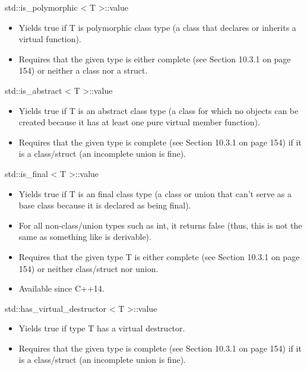 std::is\_polymorphic < T >::value

\begin{itemize}
\item 
Yields true if T is polymorphic class type (a class that declares or inherits a virtual function).

\item 
Requires that the given type is either complete (see Section 10.3.1 on page 154) or neither a class nor a struct.
\end{itemize}


std::is\_abstract < T >::value

\begin{itemize}
\item 
Yields true if T is an abstract class type (a class for which no objects can be created because it has at least one pure virtual member function).

\item 
Requires that the given type is complete (see Section 10.3.1 on page 154) if it is a class/struct (an incomplete union is fine).
\end{itemize}

std::is\_final < T >::value

\begin{itemize}
\item 
Yields true if T is an final class type (a class or union that can’t serve as a base class because it is declared as being final).

\item 
For all non-class/union types such as int, it returns false (thus, this is not the same as something like is derivable).

\item 
Requires that the given type T is either complete (see Section 10.3.1 on page 154) or neither class/struct nor union.

\item 
Available since C++14.
\end{itemize}

std::has\_virtual\_destructor < T >::value

\begin{itemize}
\item 
Yields true if type T has a virtual destructor.

\item 
Requires that the given type is complete (see Section 10.3.1 on page 154) if it is a class/struct (an incomplete union is fine).
\end{itemize}


